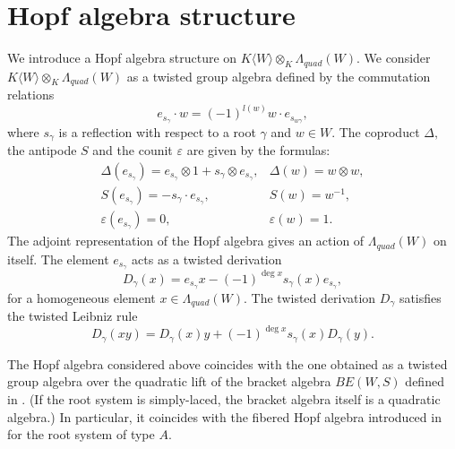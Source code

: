 \section{Hopf algebra structure}
We introduce a Hopf algebra structure on 
$K\langle W \rangle \otimes_K \Lambda_{quad}(W).$ 
We consider $K\langle W \rangle \otimes_K \Lambda_{quad}(W)$ 
as a twisted group algebra defined by the commutation relations 
\[ e_{s_{\gamma}}\cdot w = (-1)^{l(w)}w\cdot e_{s_{w\gamma}}, \]
where $s_{\gamma}$ is a reflection with respect to a root 
$\gamma$ and $w\in W.$ The coproduct $\Delta,$ the antipode 
$S$ and the counit $\varepsilon$ are given by the formulas: 
\[ 
\begin{array}{ll}
\Delta(e_{s_{\gamma }}) = e_{s_{\gamma}} \otimes 1 + s_{\gamma} 
\otimes e_{s_{\gamma}}, & \Delta (w) = w \otimes w , \\
S( e_{s_{\gamma}} ) = -s_{\gamma} \cdot e_{s_{\gamma}}, & 
S(w)= w^{-1}, \\  
\varepsilon(e_{s_{\gamma}}) =0, & \varepsilon (w)=1. 
\end{array}
\] 
The adjoint representation of the Hopf algebra gives an 
action of $\Lambda_{quad}(W)$ on itself. The element 
$e_{s_{\gamma}}$ acts as a twisted derivation 
\[ D_{\gamma} (x) = e_{s_{\gamma}}x-(-1)^{\deg x}s_{\gamma}(x)
e_{s_{\gamma}}, \] 
for a homogeneous element $x\in \Lambda_{quad}(W).$ 
The twisted derivation $D_{\gamma}$ satisfies 
the twisted Leibniz rule 
\[ D_{\gamma} (xy)= D_{\gamma}(x)y+(-1)^{\deg x}s_{\gamma}(x)
D_{\gamma}(y). \] 
\begin{rem}
{\rm The Hopf algebra considered above coincides with 
the one obtained as a twisted group algebra over the quadratic 
lift of the bracket algebra $BE(W,S)$ defined in \cite{KM}. 
(If the root system is simply-laced, the bracket algebra 
itself is a quadratic algebra.) 
In particular, it coincides with the fibered Hopf algebra 
introduced in \cite{FP} for the root system of type $A.$ }
\end{rem}
